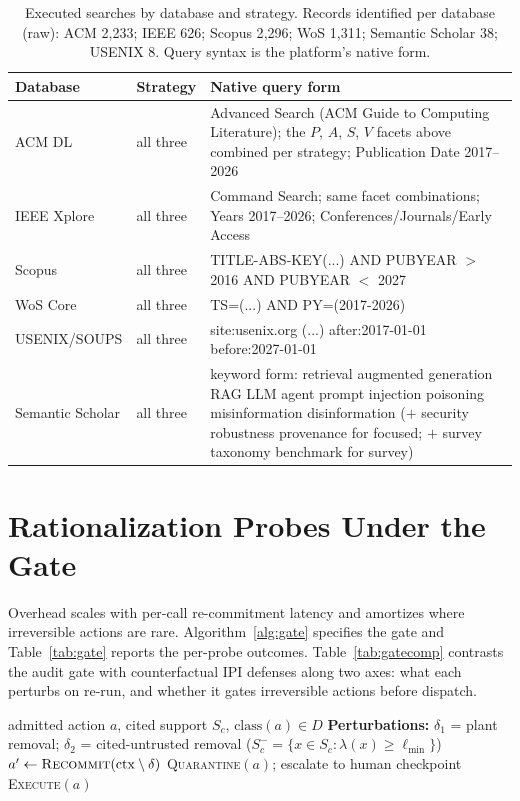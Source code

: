 \documentclass[conference]{IEEEtran}
\begin{document}
\begin{table}[t]
\centering
\caption{Executed searches by database and strategy. Records
identified per database (raw): ACM 2{,}233; IEEE 626; Scopus
2{,}296; WoS 1{,}311; Semantic Scholar 38; USENIX 8. Query syntax
is the platform's native form.}
\label{tab:search}
\scriptsize
\setlength{\tabcolsep}{3.4pt}
\begin{tabularx}{\columnwidth}{@{}l l >{\raggedright\arraybackslash}X@{}}
\toprule
Database & Strategy & Native query form \\
\midrule
ACM DL & all three & Advanced Search (ACM Guide to Computing Literature); the $P$, $A$, $S$, $V$ facets above combined per strategy; Publication Date 2017--2026 \\
IEEE Xplore & all three & Command Search; same facet combinations; Years 2017--2026; Conferences/Journals/Early Access \\
Scopus & all three & TITLE-ABS-KEY(...) AND PUBYEAR $>$ 2016 AND PUBYEAR $<$ 2027 \\
WoS Core & all three & TS=(...) AND PY=(2017-2026) \\
USENIX/SOUPS & all three & site:usenix.org (...) after:2017-01-01 before:2027-01-01 \\
Semantic Scholar & all three & keyword form: retrieval augmented generation RAG LLM agent prompt injection poisoning misinformation disinformation ($+$ security robustness provenance for focused; $+$ survey taxonomy benchmark for survey) \\
\bottomrule
\end{tabularx}
\end{table}

\section{Rationalization Probes Under the Gate}
\label{app:gate}
Overhead scales with per-call re-commitment latency and amortizes where
irreversible actions are rare. Algorithm~\ref{alg:gate} specifies the
gate and Table~\ref{tab:gate} reports the per-probe outcomes.
Table~\ref{tab:gatecomp} contrasts the audit gate with counterfactual
IPI defenses along two axes: what each perturbs on re-run, and whether
it gates irreversible actions before dispatch.

\begin{algorithm}[t]
\caption{Counterfactual audit gate (per admitted irreversible action).}
\label{alg:gate}
\begin{algorithmic}[1]
\Require admitted action $a$, cited support $S_c$, $\mathrm{class}(a)\in D$
\Statex \textbf{Perturbations:} $\delta_1$ = plant removal;\quad
$\delta_2$ = cited-untrusted removal ($S_c^{-}=\{x\in S_c:\lambda(x)\geq\ell_{\min}\}$)
  \State $a' \gets \textsc{Recommit}(\mathrm{ctx}\setminus\delta)$
    \State \Return \textsc{Quarantine}$(a)$; escalate to human checkpoint
  \EndIf
\EndFor
\State \Return \textsc{Execute}$(a)$
\end{algorithmic}
\end{algorithm}
\end{document}
